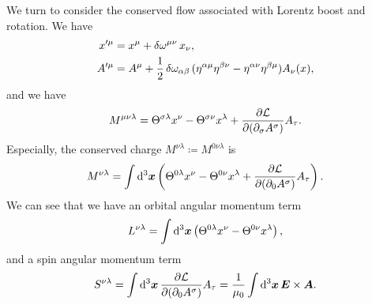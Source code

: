 \documentclass[hyperref, a4paper]{article}
\begin{document}
We turn to consider the conserved flow associated with Lorentz boost and rotation. We have 
\begin{equation}
    \begin{aligned}
        x'^\mu &= x^\mu + \var{\omega^{\mu \nu}} x_\nu, \\
        A'^\mu &= A^\mu + \frac{1}{2} \var{\omega_{\alpha \beta}} (\eta^{\alpha \mu} \eta^{\beta \nu} - \eta^{\alpha \nu} \eta^{\beta \mu}) A_\nu(x),
    \end{aligned}
\end{equation}
and we have 
\begin{equation}
    M^{\mu \nu \lambda} = \Theta^{\sigma \lambda} x^\nu - \Theta^{\sigma \nu} x^\lambda + \pdv{\mathcal{L}}{(\partial_\sigma A^\sigma)} (\eta^{\nu \sigma} \eta^{\lambda \tau} - \eta^{\nu \tau} \eta^{\lambda \sigma}) A_\tau.
\end{equation}
Especially, the conserved charge $M^{\nu \lambda} \coloneqq M^{0 \nu \lambda}$ is 
\begin{equation}
    M^{\nu \lambda} = \int \dd[3]{\vb*{x}} \left( \Theta^{0 \lambda} x^\nu - \Theta^{0 \nu} x^\lambda + \pdv{\mathcal{L}}{(\partial_0 A^\sigma)} (\eta^{\nu \sigma} \eta^{\lambda \tau} - \eta^{\nu \tau} \eta^{\lambda \sigma}) A_\tau \right).
\end{equation}
We can see that we have an orbital angular momentum term 
\begin{equation}
    L^{\nu \lambda} = \int \dd[3]{\vb*{x}} \left( \Theta^{0 \lambda} x^\nu - \Theta^{0 \nu} x^\lambda  \right), 
\end{equation} 
and a spin angular momentum term 
\begin{equation}
    S^{\nu \lambda} = \int \dd[3]{\vb*{x}} \pdv{\mathcal{L}}{(\partial_0 A^\sigma)} (\eta^{\nu \sigma} \eta^{\lambda \tau} - \eta^{\nu \tau} \eta^{\lambda \sigma}) A_\tau =  \frac{1}{\mu_0} \int \dd[3]{\vb*{x}} \vb*{E} \times \vb*{A} .
\end{equation}
\end{document}
